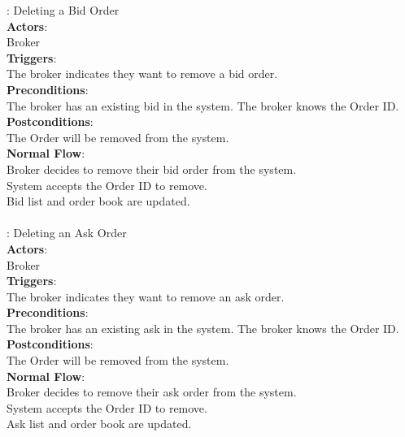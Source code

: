\documentclass[a4paper]{article}
\begin{document}
: Deleting a Bid Order \\ 
{\bf Actors}:\\
\indent Broker \\
{\bf Triggers}: \\
\indent The broker indicates they want to remove a bid order. \\
{\bf Preconditions}: \\
\indent The broker has an existing bid in the system. The broker knows the Order ID.\\
{\bf Postconditions}: \\
\indent The Order will be removed from the system. \\
{\bf Normal Flow}: \\
\indent Broker decides to remove their bid order from the system. \\
\indent System accepts the Order ID to remove. \\
\indent Bid list and order book are updated. \\ \\

: Deleting an Ask Order \\ 
{\bf Actors}:\\
\indent Broker \\
{\bf Triggers}: \\
\indent The broker indicates they want to remove an ask order. \\
{\bf Preconditions}: \\
\indent The broker has an existing ask in the system. The broker knows the Order ID.\\
{\bf Postconditions}: \\
\indent The Order will be removed from the system. \\
{\bf Normal Flow}: \\
\indent Broker decides to remove their ask order from the system. \\
\indent System accepts the Order ID to remove. \\
\indent Ask list and order book are updated. \\ \\
\end{document}
